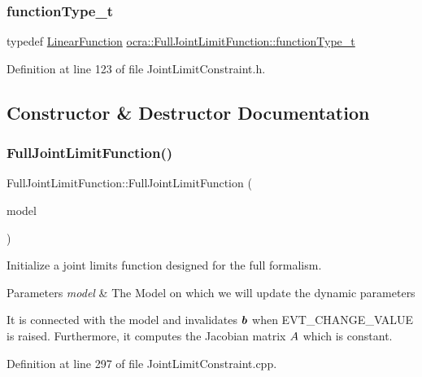 \subsubsection{\texorpdfstring{function\+Type\+\_\+t}{functionType\_t}}
{\footnotesize\ttfamily typedef \hyperlink{classocra_1_1LinearFunction}{Linear\+Function} \hyperlink{classocra_1_1FullJointLimitFunction_a3ae743a316981d67933248a9d58f58fb}{ocra\+::\+Full\+Joint\+Limit\+Function\+::function\+Type\+\_\+t}}



Definition at line 123 of file Joint\+Limit\+Constraint.\+h.



\subsection{Constructor \& Destructor Documentation}
\hypertarget{classocra_1_1FullJointLimitFunction_af49c77d067fe584cf6d3884eb33b2ed0}{}\label{classocra_1_1FullJointLimitFunction_af49c77d067fe584cf6d3884eb33b2ed0} 
\subsubsection{\texorpdfstring{Full\+Joint\+Limit\+Function()}{FullJointLimitFunction()}}
{\footnotesize\ttfamily Full\+Joint\+Limit\+Function\+::\+Full\+Joint\+Limit\+Function (\begin{DoxyParamCaption}\item[{const Model \&}]{model }\end{DoxyParamCaption})}

Initialize a joint limits function designed for the full formalism.


\begin{DoxyParams}{Parameters}
{\em model} & The Model on which we will update the dynamic parameters\\
\hline
\end{DoxyParams}
It is connected with the model and invalidates $ \mbox{\boldmath${b}$} $ when E\+V\+T\+\_\+\+C\+H\+A\+N\+G\+E\+\_\+\+V\+A\+L\+UE is raised. Furthermore, it computes the Jacobian matrix $ A $ which is constant. 

Definition at line 297 of file Joint\+Limit\+Constraint.\+cpp.

